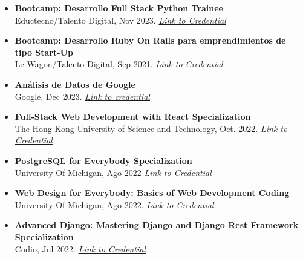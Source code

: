 \documentclass[a4paper,10pt]{article}
\begin{document}
		\begin{itemize}[left=0pt]
			
			\item \textbf{Bootcamp: Desarrollo Full Stack Python Trainee} \\
			Eductecno/Talento Digital, Nov 2023. \textit{\href{https://www.acreditta.com/credential/1654395b-6317-44bf-9beb-18774afdb129}{Link to Credential}}			

			
			\item \textbf{Bootcamp: Desarrollo Ruby On Rails para emprendimientos de tipo Start-Up} \\
			Le-Wagon/Talento Digital, Sep 2021.
			\textit{\href{https://portfolio-mparraf.herokuapp.com/static/shared/Emprendimiento web.pdf}{Link to Credential}}	
			
			 \vspace{0.2cm} %
			
			\item \textbf{Análisis de Datos de Google} \\
			Google, Dec 2023.
			\textit{\href{https://portfolio-mparraf.herokuapp.com/static/shared/AnalisisDatosGoogle.pdf}{Link to credential}}
			
			\item \textbf{Full-Stack Web Development with React Specialization} \\
			The Hong Kong University of Science and Technology, Oct. 2022.
			\textit{\href{https://portfolio-mparraf.herokuapp.com/static/shared/Full-Stack Web Development with React.pdf}{Link to Credential}}
			
			
			\item \textbf{PostgreSQL for Everybody Specialization} \\
			University Of Michigan, Ago  2022
			\textit{\href{https://portfolio-mparraf.herokuapp.com/static/shared/PostgreSQL for Everybody Specialization.pdf}{Link to Credential}}
			
			\item \textbf{Web Design for Everybody: Basics of Web Development  Coding} \\
			University Of Michigan, Ago 2022.
			\textit{\href{https://portfolio-mparraf.herokuapp.com/static/shared/Web Design for Everybody Specialization.pdf}{Link to Credential}}
			
			\item \textbf{Advanced Django: Mastering Django and Django Rest Framework Specialization} \\
			Codio, Jul 2022.
			\textit{\href{https://portfolio-mparraf.herokuapp.com/static/shared/Advanced Django Mastering Specialization.pdf}{Link to Credential}}
			

\end{itemize}
\end{document}
